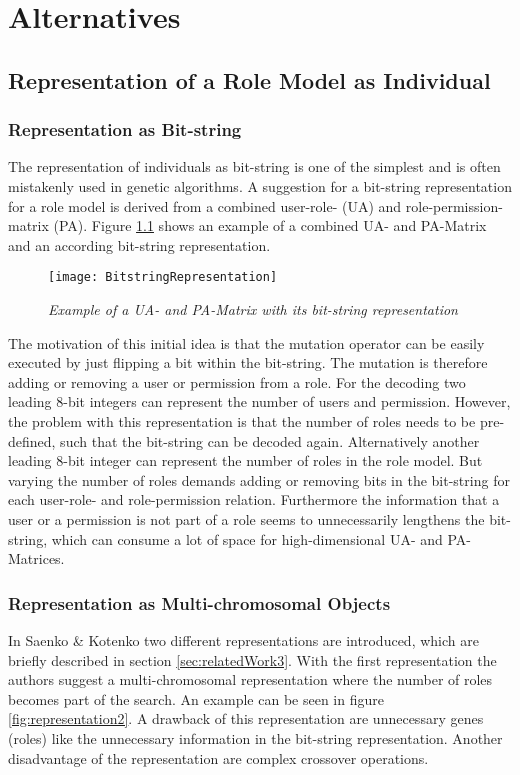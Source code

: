\chapter{Alternatives}
\section{Representation of a Role Model as Individual}
\label{sec:A_representations}
	\subsection{Representation as Bit-string}
	The representation of individuals as bit-string is one of the simplest and is often mistakenly used in genetic algorithms\cite{Eiben}. A suggestion for a bit-string representation for a role model is derived from a combined user-role- (UA) and role-permission-matrix (PA). Figure \ref{fig:representation1} shows an example of a combined UA- and PA-Matrix and an according bit-string representation.
	
	\begin{figure}[H]
		\centering
		\texttt{[image: BitstringRepresentation]}
		\caption{\textit{Example of a UA- and PA-Matrix with its bit-string representation}}
		\label{fig:representation1}
	\end{figure}
	
	The motivation of this initial idea is that the mutation operator can be easily executed by just flipping a bit within the bit-string. The mutation is therefore adding or removing a user or permission from a role. For the decoding two leading 8-bit integers can represent the number of users and permission. However, the problem with this representation is that the number of roles needs to be pre-defined, such that the bit-string can be decoded again. Alternatively another leading 8-bit integer can represent the number of roles in the role model. But varying the number of roles demands adding or removing bits in the bit-string for each user-role- and role-permission relation. Furthermore the information that a user or a permission is not part of a role seems to unnecessarily lengthens the bit-string, which can consume a lot of space for high-dimensional UA- and PA-Matrices.

	\subsection{Representation as Multi-chromosomal Objects}
	In Saenko \& Kotenko\cite{saenko2012design} two different representations are introduced, which are briefly described in section \ref{sec:relatedWork3}. With the first representation the authors suggest a multi-chromosomal representation where the number of roles becomes part of the search. An example can be seen in figure \ref{fig:representation2}. A drawback of this representation are unnecessary genes (roles) like the unnecessary information in the bit-string representation. Another disadvantage of the representation are complex crossover operations\cite{saenko2012design}.
	
